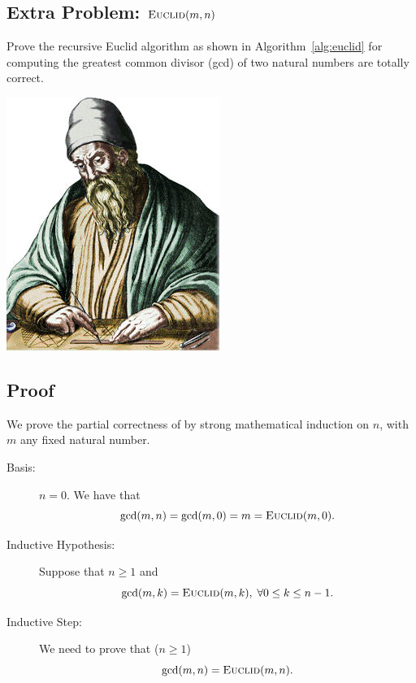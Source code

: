 \documentclass{tufte-handout}
\begin{document}
\begin{CJK*}{UTF8}{gbsn}
\section{Extra Problem: $\textsc{Euclid}(m, n)$}  \label{section:euclid}

Prove the recursive Euclid algorithm as shown in Algorithm~\ref{alg:euclid} for 
computing the greatest common divisor (gcd) of two natural numbers are totally correct.

\begin{marginfigure}%
  \includegraphics[width=0.60\linewidth]{figs/euclid}
  \label{fig:euclid}
\end{marginfigure}



\subsection{Proof}


We prove the partial correctness of \euclid{} by strong mathematical induction on $n$,
with $m$ any fixed natural number.

\begin{description}
  \item[Basis:] $n = 0$. We have that
    \[
      \gcd(m,n) = \gcd(m,0) = m = \textsc{Euclid}(m,0).
    \]
  \item[Inductive Hypothesis:]
    Suppose that $n \ge 1$ and
    \[
      \gcd(m, k) = \textsc{Euclid}(m, k), \;\forall 0 \le k \le n - 1.
    \]
  \item[Inductive Step:]
    We need to prove that ($n \ge 1$)
    \[
      \gcd(m, n) = \textsc{Euclid}(m, n).
    \]


\end{description}
\end{CJK*}
\end{document}
